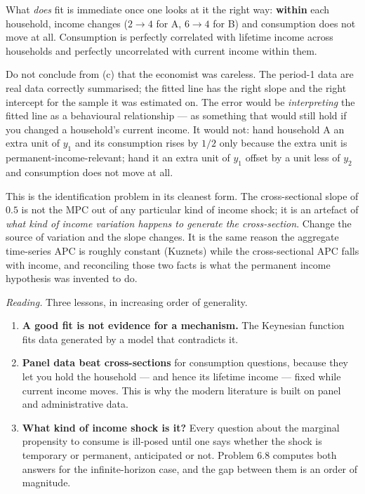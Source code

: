 \documentclass[12pt, letterpaper]{article}
\begin{document}
\begin{tcolorbox}[evenbox,title={Problem 6.4 \quad Consumption and Income}]
\begin{enumerate}
\smallskip
What \emph{does} fit is immediate once one looks at it the right way: \textbf{within} each
household, income changes ($2\to4$ for A, $6\to4$ for B) and consumption does not move at
all. Consumption is perfectly correlated with lifetime income across households and
perfectly uncorrelated with current income within them.

\end{enumerate}

\begin{tcolorbox}[trapbox]
Do not conclude from (c) that the economist was careless. The period-1 data are real data
correctly summarised; the fitted line has the right slope and the right intercept for the
sample it was estimated on. The error would be \emph{interpreting} the fitted line as a
behavioural relationship --- as something that would still hold if you changed a household's
current income. It would not: hand household A an extra unit of $y_1$ and its consumption
rises by $1/2$ only because the extra unit is permanent-income-relevant; hand it an extra
unit of $y_1$ offset by a unit less of $y_2$ and consumption does not move at all.

\smallskip
This is the identification problem in its cleanest form. The cross-sectional slope of $0.5$
is not the MPC out of any particular kind of income shock; it is an artefact of \emph{what
kind of income variation happens to generate the cross-section}. Change the source of
variation and the slope changes. It is the same reason the aggregate time-series APC is
roughly constant (Kuznets) while the cross-sectional APC falls with income, and reconciling
those two facts is what the permanent income hypothesis was invented to do.
\end{tcolorbox}

\smallskip
\emph{Reading.} Three lessons, in increasing order of generality.
\begin{enumerate}[label=\textbf{\arabic*.},leftmargin=1.6em,itemsep=3pt,topsep=3pt]
\item \textbf{A good fit is not evidence for a mechanism.} The Keynesian function fits data
      generated by a model that contradicts it.
\item \textbf{Panel data beat cross-sections} for consumption questions, because they let you
      hold the household --- and hence its lifetime income --- fixed while current income
      moves. This is why the modern literature is built on panel and administrative data.
\item \textbf{What kind of income shock is it?} Every question about the marginal propensity
      to consume is ill-posed until one says whether the shock is temporary or permanent,
      anticipated or not. Problem 6.8 computes both answers for the infinite-horizon case,
      and the gap between them is an order of magnitude.
\end{enumerate}
\end{tcolorbox}
\end{document}
